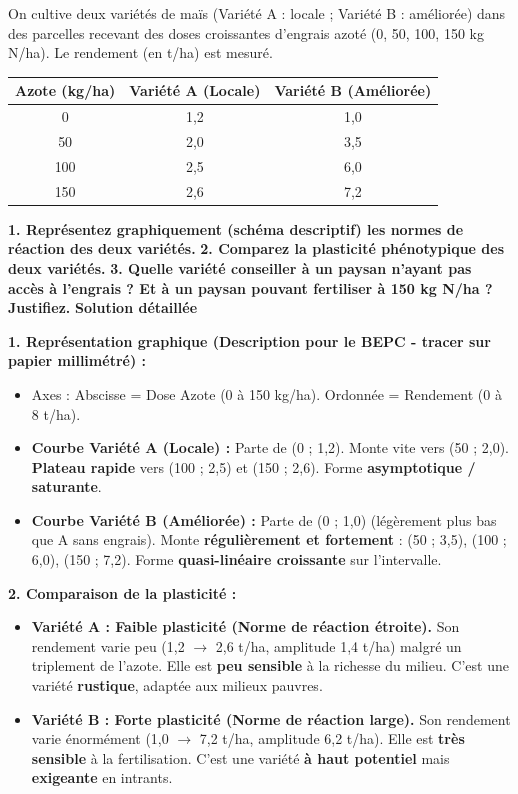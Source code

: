 \documentclass[11pt]{article}
\begin{document}
\begin{exoresolu}
On cultive deux variétés de maïs (Variété A : locale ; Variété B : améliorée) dans des parcelles recevant des doses croissantes d'engrais azoté (0, 50, 100, 150 kg N/ha). Le rendement (en t/ha) est mesuré.

\begin{center}
\begin{tabular}{|c|c|c|}\hline
\rowcolor{popblueL} \textbf{Azote (kg/ha)} & \textbf{Variété A (Locale)} & \textbf{Variété B (Améliorée)} \\ \hline
0 & 1,2 & 1,0 \\ \hline
50 & 2,0 & 3,5 \\ \hline
100 & 2,5 & 6,0 \\ \hline
150 & 2,6 & 7,2 \\ \hline
\end{tabular}
\end{center}

\textbf{1. Représentez graphiquement (schéma descriptif) les normes de réaction des deux variétés.}
\textbf{2. Comparez la plasticité phénotypique des deux variétés.}
\textbf{3. Quelle variété conseiller à un paysan n'ayant pas accès à l'engrais ? Et à un paysan pouvant fertiliser à 150 kg N/ha ? Justifiez.}
\tcblower
\textbf{Solution détaillée}

\textbf{1. Représentation graphique (Description pour le BEPC - tracer sur papier millimétré) :}
\begin{itemize}
    \item Axes : Abscisse = Dose Azote (0 à 150 kg/ha). Ordonnée = Rendement (0 à 8 t/ha).
    \item \textbf{Courbe Variété A (Locale) :} Parte de (0 ; 1,2). Monte vite vers (50 ; 2,0). \textbf{Plateau rapide} vers (100 ; 2,5) et (150 ; 2,6). Forme \textbf{asymptotique / saturante}.
    \item \textbf{Courbe Variété B (Améliorée) :} Parte de (0 ; 1,0) (légèrement plus bas que A sans engrais). Monte \textbf{régulièrement et fortement} : (50 ; 3,5), (100 ; 6,0), (150 ; 7,2). Forme \textbf{quasi-linéaire croissante} sur l'intervalle.
\end{itemize}

\textbf{2. Comparaison de la plasticité :}
\begin{itemize}
    \item \textbf{Variété A : Faible plasticité (Norme de réaction étroite).} Son rendement varie peu (1,2 $\rightarrow$ 2,6 t/ha, amplitude 1,4 t/ha) malgré un triplement de l'azote. Elle est \textbf{peu sensible} à la richesse du milieu. C'est une variété \textbf{rustique}, adaptée aux milieux pauvres.
    \item \textbf{Variété B : Forte plasticité (Norme de réaction large).} Son rendement varie énormément (1,0 $\rightarrow$ 7,2 t/ha, amplitude 6,2 t/ha). Elle est \textbf{très sensible} à la fertilisation. C'est une variété \textbf{à haut potentiel} mais \textbf{exigeante} en intrants.
\end{itemize}


\end{exoresolu}
\end{document}
